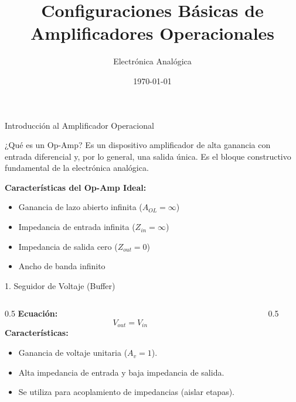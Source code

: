 \documentclass{beamer}
\title[Amplificadores Operacionales]{Configuraciones Básicas de Amplificadores Operacionales}
\author{Electrónica Analógica}
\date{\today}
\begin{document}
\begin{frame}
    \titlepage
\end{frame}

\begin{frame}{Introducción al Amplificador Operacional}
    \begin{block}{¿Qué es un Op-Amp?}
        Es un dispositivo amplificador de alta ganancia con entrada diferencial y, por lo general, una salida única. Es el bloque constructivo fundamental de la electrónica analógica.
    \end{block}
    \vspace{0.3cm}
    \textbf{Características del Op-Amp Ideal:}
    \begin{itemize}
        \item Ganancia de lazo abierto infinita ($A_{OL} = \infty$)
        \item Impedancia de entrada infinita ($Z_{in} = \infty$)
        \item Impedancia de salida cero ($Z_{out} = 0$)
        \item Ancho de banda infinito
    \end{itemize}
\end{frame}

\begin{frame}{1. Seguidor de Voltaje (Buffer)}
    \begin{columns}
        \begin{column}{0.5\textwidth}
            \textbf{Ecuación:}
            \[ V_{out} = V_{in} \]
            \vspace{0.2cm}
            \textbf{Características:}
            \begin{itemize}
                \item Ganancia de voltaje unitaria ($A_v = 1$).
                \item Alta impedancia de entrada y baja impedancia de salida.
                \item Se utiliza para acoplamiento de impedancias (aislar etapas).
            \end{itemize}
        \end{column}
        \begin{column}{0.5\textwidth}
            \begin{centering}
            \end{centering}
        \end{column}
    \end{columns}
\end{frame}
\end{document}
